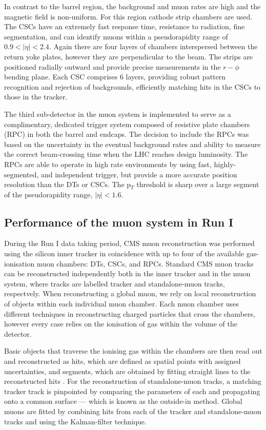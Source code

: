 In contrast to the barrel region, the background and muon rates are high and the magnetic field is non-uniform. For this region cathode strip chambers are used. The CSCs have an extremely fast response time, resistance to radiation, fine segmentation, and can identify muons within a pseudorapidity range of $0.9 < |\eta| < 2.4$. Again there are four layers of chambers interspersed between the return yoke plates, however they are perpendicular to the beam. The strips are positioned radially outward and provide precise measurements in the $r-\phi$ bending plane. Each CSC comprises 6 layers, providing robust pattern recognition and rejection of backgrounds, efficiently matching hits in the CSCs to those in the tracker.

The third sub-detector in the muon system is implemented to serve as a complimentary, dedicated trigger system composed of resistive plate chambers (RPC) in both the barrel and endcaps. The decision to include the RPCs was based on the uncertainty in the eventual background rates and ability to measure the correct beam-crossing time when the LHC reaches design luminosity. The RPCs are able to operate in high rate environments by using fast, highly-segmented, and independent trigger, but provide a more accurate position resolution than the DTs or CSCs. The p$_T$ threshold is sharp over a large segment of the pseudorapidity range, $|\eta|<1.6$. 

\subsection{Performance of the muon system in Run I} \label{subsec-MuonSystemPerformance}

During the Run I data taking period, CMS muon reconstruction was performed using the silicon inner tracker in coincidence with up to four of the available gas-ionisation muon chambers: DTs, CSCs, and RPCs. Standard CMS muon tracks can be reconstructed independently both in the inner tracker and in the muon system, where tracks are labelled tracker and standalone-muon tracks, respectvely. When reconstructing a global muon, we rely on local reconstruction of objects within each individual muon chamber. Each muon chamber uses different techniques in reconstructing charged particles that cross the chambers, however every case relies on the ionisation of gas within the volume of the detector.  

Basic objects that traverse the ionising gas within the chambers are then read out and reconstructed as hits, which are defined as spatial points with assigned uncertainties, and segments, which are obtained by fitting straight lines to the reconstructed hits \cite{Chatrchyan:2013sba}. For the reconstruction of standalone-muon tracks, a matching tracker track is pinpointed by comparing the parameters of each and propagating onto a common surface --- which is known as the outside-in method. Global muons are fitted by combining hits from each of the tracker and standalone-muon tracks and using the Kalman-filter technique. 

